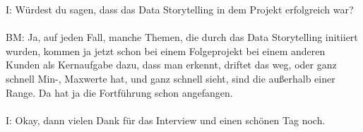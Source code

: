 \begin{linenumbers}
I: Würdest du sagen, dass das Data Storytelling in dem Projekt erfolgreich war?\\\\
BM: Ja, auf jeden Fall, manche Themen, die durch das Data Storytelling initiiert wurden, kommen ja jetzt schon bei einem Folgeprojekt bei einem anderen Kunden als Kernaufgabe dazu, dass man erkennt, driftet das weg, oder ganz schnell Min-, Maxwerte hat, und ganz schnell sieht, sind die außerhalb einer Range. Da hat ja die Fortführung schon angefangen.\\\\
I: Okay, dann vielen Dank für das Interview und einen schönen Tag noch.
\end{linenumbers}